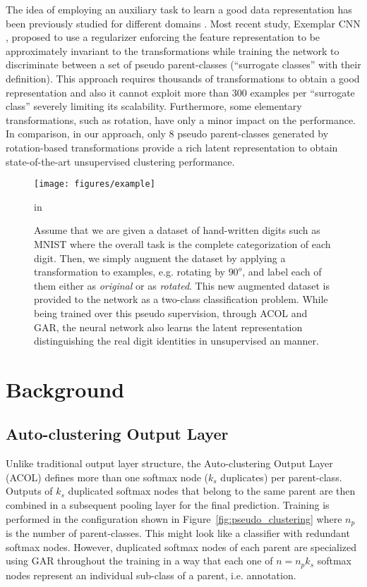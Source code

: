 \documentclass{article} \usepackage{iclr2018_conference,times}
\begin{document}
The idea of employing an auxiliary task to learn a good data representation has been previously studied for different domains \citep{CollobertWBKKK11, AhmedYXGX08}. Most recent study, Exemplar CNN \citep{DosovitskiyFSRB16}, proposed to use a regularizer enforcing the feature representation to be approximately invariant to the transformations while training the network to discriminate between a set of pseudo parent-classes (``surrogate classes'' with their definition). This approach requires thousands of transformations to obtain a good representation and also it cannot exploit more than 300 examples per ``surrogate class'' severely limiting its scalability. Furthermore, some elementary transformations, such as rotation, have only a minor impact on the performance. In comparison, in our approach, only 8 pseudo parent-classes generated by rotation-based transformations provide a rich latent representation to obtain state-of-the-art unsupervised clustering performance. 

\begin{figure}[t]
	\begin{center}
		\centerline{\texttt{[image: figures/example]}}
		\caption{Assume that we are given a dataset of hand-written digits such as MNIST where the overall task is the complete categorization of each digit. Then, we simply augment the dataset by applying a transformation to examples, e.g. rotating by $90^o$, and label each of them either as \textit{original} or as \textit{rotated}. This new augmented dataset is provided to the network as a two-class classification problem. While being trained over this pseudo supervision, through ACOL and GAR, the neural network also learns the latent representation distinguishing the real digit identities in unsupervised an manner.}
		\label{fig:pseudo_motivation}
	\end{center}
	 in
\end{figure}

\section{Background}
\subsection{Auto-clustering Output Layer}

Unlike traditional output layer structure, the Auto-clustering Output Layer (ACOL) \citep{KilincU17ACOL} defines more than one softmax node ($k_s$ duplicates) per parent-class. Outputs of $k_s$ duplicated softmax nodes that belong to the same parent are then combined in a subsequent pooling layer for the final prediction. Training is performed in the configuration shown in Figure~\ref{fig:pseudo_clustering} where $n_p$ is the number of parent-classes. This might look like a classifier with redundant softmax nodes. However, duplicated softmax nodes of each parent are specialized using GAR throughout the training in a way that each one of $n=n_pk_s$ softmax nodes represent an individual sub-class of a parent, i.e. annotation.
\end{document}
